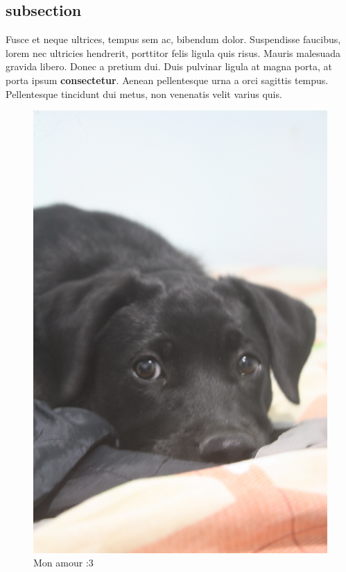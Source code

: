 \documentclass[12pt,letterpaper,oneside]{book}
\begin{document}
\subsection{subsection}
\noindent Fusce et neque ultrices, tempus sem ac, bibendum dolor. Suspendisse faucibus, lorem nec ultricies hendrerit, porttitor felis ligula quis risus. Mauris malesuada gravida libero. Donec a pretium dui. Duis pulvinar ligula at magna porta, at porta ipsum \textbf{consectetur}. Aenean pellentesque urna a orci sagittis tempus. Pellentesque tincidunt dui metus, non venenatis velit varius quis.

\begin{figure}[h]
\centering
\includegraphics[scale=.1]{img/milla.jpg}
\caption{Mon amour :3}
\end{figure}
\end{document}
